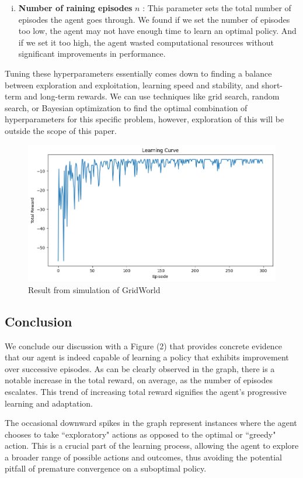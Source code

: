 \begin{enumerate}[(i)]
    \item \textbf{Number of raining episodes} $n$ : This parameter sets the total number of episodes the agent goes through. We found if we set the number of episodes too low, the agent may not have enough time to learn an optimal policy. And if we set it too high, the agent wasted computational resources without significant improvements in performance.

\end{enumerate} 
Tuning these hyperparameters essentially comes down to finding a balance between exploration and exploitation, learning speed and stability, and short-term and long-term rewards. We can use techniques like grid search, random search, or Bayesian optimization to find the optimal combination of hyperparameters for this specific problem, however, exploration of this will be outside the scope of this paper.

\begin{figure}\label{result}
\includegraphics[width=12cm]{lectures/diagrams/result.png}
\centering
\caption{Result from simulation of GridWorld}
\end{figure}
\subsection{Conclusion}
We conclude our discussion with a Figure (2) that provides concrete evidence that our agent is indeed capable of learning a policy that exhibits improvement over successive episodes. As can be clearly observed in the graph, there is a notable increase in the total reward, on average, as the number of episodes escalates. This trend of increasing total reward signifies the agent's progressive learning and adaptation.

The occasional downward spikes in the graph represent instances where the agent chooses to take ``exploratory" actions as opposed to the optimal or ``greedy" action. This is a crucial part of the learning process, allowing the agent to explore a broader range of possible actions and outcomes, thus avoiding the potential pitfall of premature convergence on a suboptimal policy.

